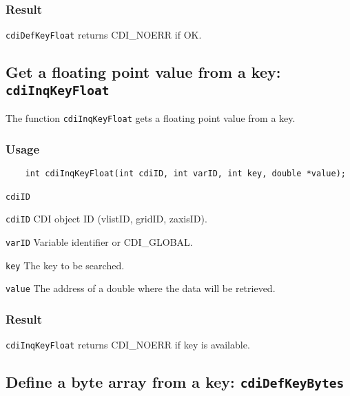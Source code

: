 \subsubsection*{Result}

{\texttt{cdiDefKeyFloat}} returns CDI\_NOERR if OK.



\subsection{Get a floating point value from a key: \texttt{cdiInqKeyFloat}}
\label{cdiInqKeyFloat}

The function {\texttt{cdiInqKeyFloat}} gets a floating point value from a key.

\subsubsection*{Usage}

\begin{verbatim}
    int cdiInqKeyFloat(int cdiID, int varID, int key, double *value);
\end{verbatim}

\hspace*{4mm}\begin{minipage}[]{15cm}
\begin{deflist}{\texttt{cdiID}\ }
\item[\texttt{cdiID}]
CDI object ID (vlistID, gridID, zaxisID).
\item[\texttt{varID}]
Variable identifier or CDI\_GLOBAL.
\item[\texttt{key}]
The key to be searched.
\item[\texttt{value}]
The address of a double where the data will be retrieved.

\end{deflist}
\end{minipage}

\subsubsection*{Result}

{\texttt{cdiInqKeyFloat}} returns CDI\_NOERR if key is available.



\subsection{Define a byte array from a key: \texttt{cdiDefKeyBytes}}
\label{cdiDefKeyBytes}


